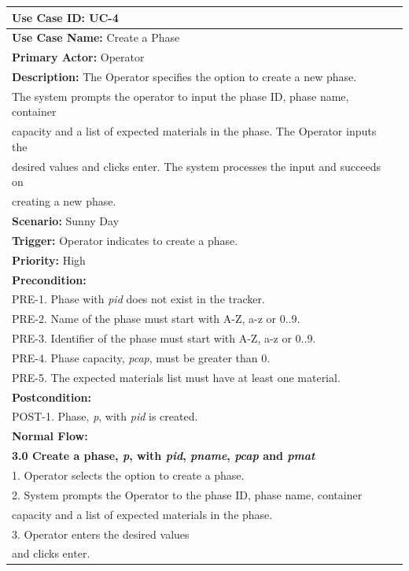 \begin{table}[h]
\begin{center}
\begin{tabular}{|l|l|}
\hline
\textbf{Use Case ID:} UC-4 \\ \hline
\textbf{Use Case Name:} Create a Phase \\ \hline
\textbf {Primary Actor:} Operator \\ \hline
\textbf{Description:} The Operator specifies the option to create a new phase. \\The system prompts the operator to input the phase ID, phase name, container \\capacity and a list of expected materials in the phase. The Operator inputs the\\ desired values and clicks enter. The system processes the input and succeeds on \\creating a new phase. \\ \hline
\textbf{Scenario:} Sunny Day \\ \hline
\textbf{Trigger:} Operator indicates to create a phase.\\ \hline
\textbf{Priority:} High \\ \hline
\textbf{Precondition:}
\\ PRE-1. Phase with \emph{pid} does not exist in the tracker.
\\ PRE-2. Name of the phase must start with A-Z, a-z or 0..9.
\\ PRE-3. Identifier of the phase must start with A-Z, a-z or 0..9.
\\ PRE-4. Phase capacity, \emph{pcap}, must be greater than 0.
\\ PRE-5. The expected materials list must have at least one material. \\ \hline
\textbf{Postcondition:}
\\ POST-1. Phase, \emph{p}, with \emph{pid} is created. \\ \hline
\textbf{Normal Flow:} 
\\ \textbf{3.0 Create a phase, \emph{p}, with \emph{pid}, \emph{pname}, \emph{pcap} and \emph{pmat}}
\\ 1. Operator selects the option to create a phase.
\\ 2. System prompts the Operator to the phase ID, phase name, container \\capacity and a list of expected materials in the phase.
\\ 3. Operator enters the desired values \\and clicks enter.

\end{tabular}
\end{center}
\end{table}
